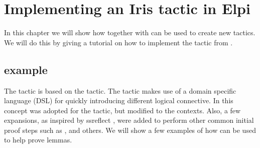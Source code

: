 \documentclass[thesis.tex]{subfiles}
\begin{document}
\chapter{Implementing an Iris tactic in Elpi}
In this chapter we will show how \elpi together with \ce can be used to create new tactics. We will do this by giving a tutorial on how to implement the  tactic from \iris.


\section[iIntros example]{ example}
The tactic  is based on the \coq {} tactic. The \coq {} tactic makes use of a domain specific language (DSL) for quickly introducing different logical connective. In \iris this concept was adopted for the  tactic, but modified to the \iris contexts. Also, a few expansions, as inspired by ssreflect \cite*{huetCoqProofAssistant1997, gonthierSmallScaleReflection2016}, were added to perform other common initial proof steps such as ,  and others. We will show a few examples of how  can be used to help prove lemmas.
\end{document}
